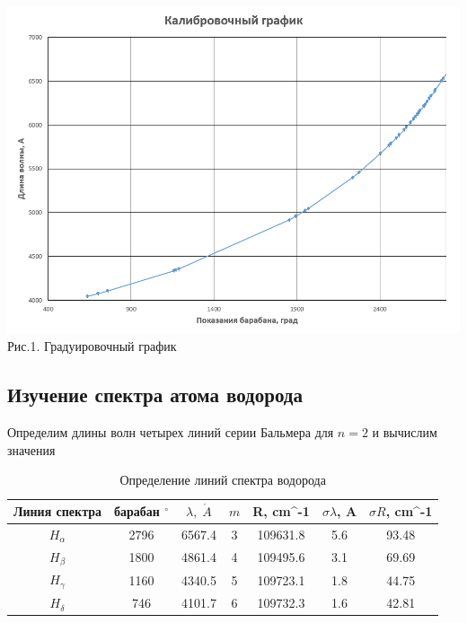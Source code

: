 \documentclass[14pt,a4paper]{scrartcl}
\begin{document}
\begin{center}
\includegraphics[scale=0.7]{grad.png}\newline
Рис.1. Градуировочный график
\end{center}



\subsection{Изучение спектра атома водорода}



Определим длины волн четырех линий серии Бальмера для $n = 2$ и вычислим значения 


		\begin{table}[h!]
		\caption{Определение линий спектра водорода}
		\begin{center}
			\begin{tabular}{|c|c|c|c|c|c|c|}
				\hline 
				Линия спектра &  барабан $^\circ $ & $ \lambda, \;\mathring{A} $ & $ m $ & R, cm^{-1} & $\sigma \lambda$, A & $\sigma R$, cm^{-1} \\ 
				\hline 
			$ H_\alpha $ & 2796 & 6567.4 & 3 & 109631.8 & 5.6 & 93.48 \\
		$ H_\beta $  & 1800 & 4861.4 &     4 & 109495.6 & 3.1 & 69.69 \\
			$ H_\gamma $ & 1160 & 4340.5 & 5 & 109723.1 & 1.8 & 44.75 \\
			$ H_\delta $ & 746 & 4101.7 &  6 & 109732.3 & 1.6 & 42.81 \\
				\hline 
			\end{tabular} 
		\end{center}
		\label{table_mn}
	\end{table}
\end{document}
